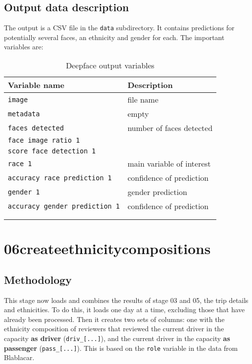 \documentclass[11pt,a4paper]{article}
\begin{document}
\subsection{Output data description}
The output is a CSV file in the \verb|data| subdirectory.
It contains predictions for potentially several faces, an ethnicity and gender for each.
The important variables are:
\begin{longtable}{p{}p{}}
	\textbf{Variable name}					& \textbf{Description} \\\hline\hline
	\verb|image|							& file name		\\
	\verb|metadata|							& empty   	\\
	\verb|faces detected|					& number of faces detected		\\
	\verb|face image ratio 1|				&		\\
	\verb|score face detection 1|			&		\\\hline
	\verb|race 1|							& main variable of interest		\\
	\verb|accuracy race prediction 1|		& confidence of prediction		\\\hline
	\verb|gender 1|							& gender prediction		\\
	\verb|accuracy gender prediction 1|		& confidence of prediction	\\\hline\\
\caption{Deepface output variables}
\end{longtable}












\clearpage %
\section{06\textunderscore create\textunderscore ethnicity\textunderscore compositions}

\subsection{Methodology}
This stage now loads and combines the results of stage 03 and 05, the trip details and ethnicities.
To do this, it loads one day at a time, excluding those that have already been processed.
Then it creates two sets of columns: 
one with the ethnicity composition of reviewers that reviewed the current driver in the capacity \textbf{as driver} (\verb|driv_[...]|), and the current driver in the capacity \textbf{as passenger} (\verb|pass_[...]|).
This is based on the \verb|role| variable in the data from Blablacar.
\end{document}
